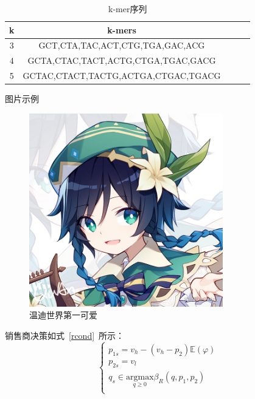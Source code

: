 \begin{table}[H]
\caption{k-mer序列}\label{tab:table1}
\vspace{0.5em}\centering\wuhao
\begin{tabular}{ccccc}
\toprule[1.5pt]
k & k-mers\\
\midrule[1pt]
3 & GCT,CTA,TAC,ACT,CTG,TGA,GAC,ACG     \\
4 & GCTA,CTAC,TACT,ACTG,CTGA,TGAC,GACG  \\
5 & GCTAC,CTACT,TACTG,ACTGA,CTGAC,TGACG \\
\bottomrule[1.5pt]
\end{tabular}
\vspace{\baselineskip}
\end{table}
图片示例
\begin{figure}[htb]
\centering
\includegraphics[width=0.75\textwidth]{figures/windy.jpeg}
\caption{温迪世界第一可爱}\label{fig:k-mer1}
\vspace{2em}
\end{figure}

销售商决策如式~\eqref{rcond}~所示：
\begin{equation}
    \label{rcond}
    \left\{\begin{array}{l}
        p_{1s}=v_h-(v_h-p_2)\mathbb{E}(\varphi)                            \\
        p_{2s}=v_l                                                         \\
        q_s \in \underset{q \geq 0}{\mathrm{argmax}} \beta_R (q, p_1, p_2) \\
    \end{array}\right.
\end{equation}
